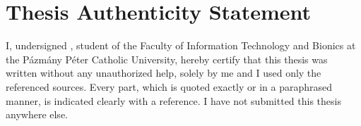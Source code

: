 
\chapter*{Thesis Authenticity Statement}
I, undersigned \name, student of the Faculty of Information Technology and Bionics at the Pázmány Péter Catholic University, hereby certify that this thesis was written without any unauthorized help, solely by me and I used only the referenced sources. Every part, which is quoted exactly or in a paraphrased manner, is indicated clearly with a reference. I have not submitted this thesis anywhere else.

\begin{flushright}
	\vspace*{.5cm}\par\noindent\makebox[2.5in]{\hrulefill}
	\par\noindent\makebox[2.5in][c]{\name}
\end{flushright}

\clearpage